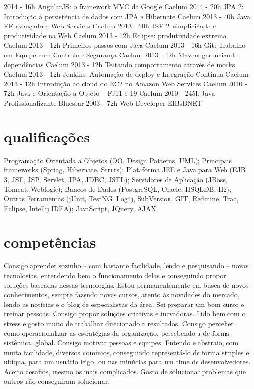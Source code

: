 \documentclass[]{friggeri-cv}
\begin{document}
\begin{entrylistii}
  \entryii
    {2014 - 16h}
    {AngularJS: o framework MVC da Google}
    {Caelum}
  \entryii
    {2014 - 20h}
    {JPA 2: Introdução à persistência de dados com JPA e Hibernate}
    {Caelum}
  \entryii
    {2013 - 40h}
    {Java EE avançado e Web Services}
    {Caelum}
  \entryii
    {2013 - 20h}
    {JSF 2: simplicidade e produtividade na Web}
    {Caelum}
  \entryii
    {2013 - 12h}
    {Eclipse: produtividade extrema}
    {Caelum}
  \entryii
    {2013 - 12h}
    {Primeiros passos com Java}
    {Caelum}
  \entryii
    {2013 - 16h}
    {Git: Trabalho em Equipe com Controle e Segurança}
    {Caelum}
  \entryii
    {2013 - 12h}
    {Maven: gerenciando dependências}
    {Caelum}
  \entryii
    {2013 - 12h}
    {Testando comportamento através de mocks}
    {Caelum}
  \entryii
    {2013 - 12h}
    {Jenkins: Automação de deploy e Integração Contínua}
    {Caelum}
  \entryii
    {2013 - 12h}
    {Introdução ao cloud do EC2 no Amazon Web Services}
    {Caelum}
  \entryii
    {2010 - 72h}
    {Java e Orientação a Objeto – FJ11 e 19}
    {Caelum}
  \entryii
    {2010 - 245h}
    {Java Profissionalizante}
    {Bluestar}
  \entryii
    {2003 - 72h}
    {Web Developer}
    {EIBsBNET}
\end{entrylistii}

\newpage

\section{qualificações}

Programação Orientada a Objetos (OO, Design Patterns, UML); Principais frameworks (Spring, Hibernate, Struts); Plataforma JEE e Java para Web (EJB 3, JSF, JSP, Servlet, JPA, JDBC, JSTL); Servidores de Aplicação (JBoss, Tomcat, Weblogic); Bancos de Dados (PostgreSQL, Oracle, HSQLDB, H2); Outras Ferramentas (jUnit, TestNG, Log4j, SubVersion, GIT, Redmine, Trac, Eclipse, Intellij IDEA); JavaScript, JQuery, AJAX.

\section{competências}

Consigo aprender sozinho – com bastante facilidade, lendo e pesquisando – novas tecnologias, entendendo bem o funcionamento delas e conseguindo propor soluções baseadas nessas tecnologias. Estou permanentemente em busca de novos conhecimentos, sempre fazendo novos cursos, atento às novidades do mercado, lendo as notícias e o blog de especialistas da área.
Sei preparar um bom curso e treinar pessoas.
Consigo propor soluções criativas e inovadoras.
Lido bem com o stress e gosto muito de trabalhar direcionado a resultados.
Consigo perceber como operacionalizar as estratégias da organização, percebendo-a de forma sistêmica, global.
Consigo motivar pessoas e equipes.
Entendo e abstraio, com muita facilidade, diversos domínios, conseguindo representá-lo de forma simples e ubíqua, para um usuário leigo, ou nas minúcias para um time de desenvolvedores.
Aceito desafios, mesmo os mais complicados.
Gosto de solucionar problemas que outros não conseguiram solucionar.
\end{document}
